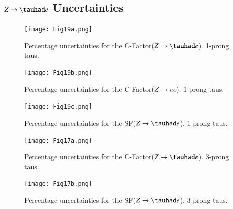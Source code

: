 \subsection{$Z\to\tauhad e$ Uncertainties}\label{zteuncer}
\begin{figure}[htbp]
	\centering
	\texttt{[image: Fig19a.png]}
	\caption{Percentage uncertainties for the C-Factor($Z\to\tauhad e$). 1-prong taus.}
	\label{Fig19a}
\end{figure}
\begin{figure}[htbp]
	\centering
	\texttt{[image: Fig19b.png]}
	\caption{Percentage uncertainties for the C-Factor($Z\to ee$). 1-prong taus.}
	\label{Fig19b}
\end{figure}
\begin{figure}[htbp]
	\centering
	\texttt{[image: Fig19c.png]}
	\caption{Percentage uncertainties for the SF($Z\to\tauhad e$). 1-prong taus.}
	\label{Fig19c}
\end{figure}

\begin{figure}[htbp]
	\centering
	\texttt{[image: Fig17a.png]}
	\caption{Percentage uncertainties for the C-Factor($Z\to\tauhad e$). 3-prong taus.}
	\label{Fig20a}
\end{figure}
\begin{figure}[htbp]
	\centering
	\texttt{[image: Fig17b.png]}
	\caption{Percentage uncertainties for the SF($Z\to\tauhad e$). 3-prong taus.}
	\label{Fig20b}
\end{figure}
